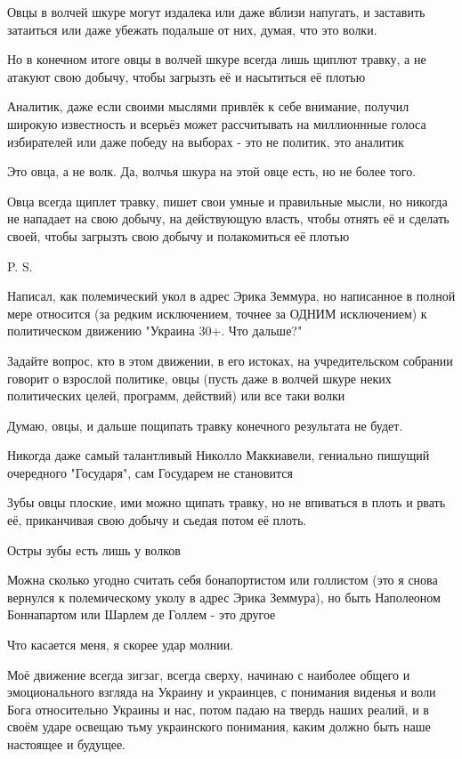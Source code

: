 \begin{itemize}
Овцы в волчей шкуре могут издалека или даже вблизи напугать, и заставить
затаиться или даже убежать подальше от них, думая, что это волки.

Но в конечном итоге овцы в волчей шкуре всегда лишь щиплют травку, а не атакуют
свою добычу, чтобы загрызть её и насытиться её плотью

Аналитик, даже если своими мыслями привлёк к себе внимание, получил широкую
известность и всерьёз может рассчитывать на миллионнные голоса избирателей или
даже победу на выборах - это не политик, это аналитик

Это овца, а не волк. Да, волчья шкура на этой овце есть, но не более того.

Овца всегда щиплет травку, пишет свои умные и правильные мысли, но никогда не
нападает на свою добычу, на действующую власть, чтобы отнять её и сделать
своей, чтобы загрызть свою добычу и полакомиться её плотью

P. S.

Написал, как полемический укол в адрес Эрика Земмура, но написанное в полной
мере относится (за редким исключением, точнее за ОДНИМ исключением) к
политическом движению "Украина 30+. Что дальше?"

Задайте вопрос, кто в этом движении, в его истоках, на учредительском собрании
говорит о взрослой политике, овцы (пусть даже в волчей шкуре неких политических
целей, программ, действий) или все таки волки

Думаю, овцы, и дальше пощипать травку конечного результата не будет.

Никогда даже самый талантливый Николло Маккиавели, гениально пишущий очередного
"Государя", сам Государем не становится

Зубы овцы плоские, ими можно щипать травку, но не впиваться в плоть и рвать её,
приканчивая свою добычу и сьедая потом её плоть.

Остры зубы есть лишь у волков

Можна сколько угодно считать себя бонапортистом или голлистом (это я снова
вернулся к полемическому уколу в адрес Эрика Земмура), но быть Наполеоном
Боннапартом или Шарлем де Голлем - это другое

Что касается меня, я скорее удар молнии.

Моё движение всегда зигзаг, всегда сверху, начинаю с наиболее общего и
эмоционального взгляда на Украину и украинцев, с понимания виденья и воли Бога
относительно Украины и нас, потом падаю на твердь наших реалий, и в своём ударе
освещаю тьму украинского понимания, каким должно быть наше настоящее и будущее.


\end{itemize}
